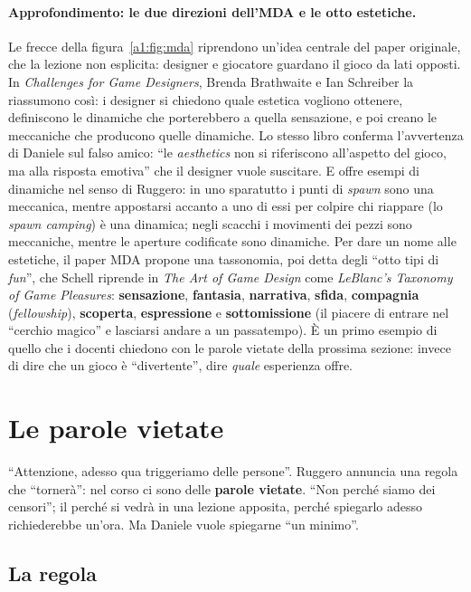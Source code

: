 \paragraph{Approfondimento: le due direzioni dell'MDA e le otto estetiche.} Le
frecce della figura~\ref{a1:fig:mda} riprendono un'idea centrale del paper
originale, che la lezione non esplicita: designer e giocatore guardano il gioco
da lati opposti. In \emph{Challenges for Game Designers}, Brenda Brathwaite e
Ian Schreiber la riassumono così: i designer si chiedono quale estetica
vogliono ottenere, definiscono le dinamiche che porterebbero a quella
sensazione, e poi creano le meccaniche che producono quelle dinamiche. Lo stesso
libro conferma l'avvertenza di Daniele sul falso amico: ``le \emph{aesthetics}
non si riferiscono all'aspetto del gioco, ma alla risposta emotiva'' che il
designer vuole suscitare. E offre esempi di dinamiche nel senso di Ruggero: in
uno sparatutto i punti di \emph{spawn} sono una meccanica, mentre appostarsi
accanto a uno di essi per colpire chi riappare (lo \emph{spawn camping}) è una
dinamica; negli scacchi i movimenti dei pezzi sono meccaniche, mentre le
aperture codificate sono dinamiche. Per dare un nome alle estetiche, il paper
MDA propone una tassonomia, poi detta degli ``otto tipi di \emph{fun}'', che
Schell riprende in \emph{The Art of Game Design} come \emph{LeBlanc's Taxonomy of
Game Pleasures}: \textbf{sensazione}, \textbf{fantasia}, \textbf{narrativa},
\textbf{sfida}, \textbf{compagnia} (\emph{fellowship}), \textbf{scoperta},
\textbf{espressione} e \textbf{sottomissione} (il piacere di entrare nel
``cerchio magico'' e lasciarsi andare a un passatempo). È un primo esempio di
quello che i docenti chiedono con le parole vietate della prossima sezione:
invece di dire che un gioco è ``divertente'', dire \emph{quale} esperienza
offre.

\section{Le parole vietate}
\label{a1:sec:parole-vietate}

``Attenzione, adesso qua triggeriamo delle persone''. Ruggero annuncia una regola
che ``tornerà'': nel corso ci sono delle \textbf{parole vietate}. ``Non perché
siamo dei censori''; il perché si vedrà in una lezione apposita, perché
spiegarlo adesso richiederebbe un'ora. Ma Daniele vuole spiegarne ``un
minimo''.

\subsection{La regola}

